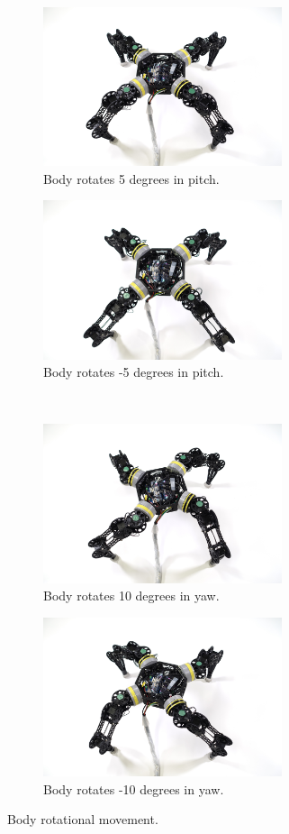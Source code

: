 \begin{figure}[ht]
\begin{subfigure}[b]{0.45\textwidth}
        \centering
        \includegraphics[width=70mm]{./fig/chap4/body_movement/p05pitch.JPG}
        \caption{Body rotates 5 degrees in pitch.}
        \label{protpitch}
    \end{subfigure}
    \begin{subfigure}[b]{0.45\textwidth}
        \centering
        \includegraphics[width=70mm]{./fig/chap4/body_movement/n05pitch.JPG}
        \caption{Body rotates -5 degrees in pitch.}
        \label{nrotpitch}
    \end{subfigure}
    \\
    \begin{subfigure}[b]{0.45\textwidth}
        \centering
        \includegraphics[width=70mm]{./fig/chap4/body_movement/p10yaw.JPG}
        \caption{Body rotates 10 degrees in yaw.}
        \label{protyaw}
    \end{subfigure}
    \begin{subfigure}[b]{0.45\textwidth}
        \centering
        \includegraphics[width=70mm]{./fig/chap4/body_movement/n10yaw.JPG}
        \caption{Body rotates -10 degrees in yaw.}
        \label{nrotyaw}
    \end{subfigure}
    \caption{Body rotational movement.}
    \label{rot}
\end{figure}

